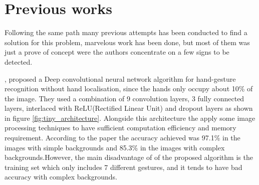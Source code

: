 \documentclass[12pt]{report}
\begin{document}
\section{Previous works}
Following the same path many previous attempts has been conducted 
to find a solution for this problem, marvelous work has been done, 
but most of them was just a prove of concept were the authors concentrate 
on a few signs to be detected.


\cite{Bao2017}, proposed a Deep convolutional neural network algorithm for hand-gesture 
recognition without hand localisation, since the hands only occupy about 10\% of 
the image. They used a combination of 9 convolution layers, 3 fully connected layers, 
interlaced with ReLU(Rectified Linear Unit) and dropout layers as shown in 
figure \ref{fig:tiny_architecture}. Alongside this architecture the apply some image 
processing techniques to have sufficient computation efficiency and memory requirement.
According to the paper the accuracy achieved was 97.1\% in the images with simple backgrounds
and 85.3\% in the images with complex backgrounds.However, the main disadvantage of of 
the proposed algorithm is the training set which only includes 7 different gestures,
and it tends to have bad accuracy with complex backgrounds.
\bigbreak
\end{document}
